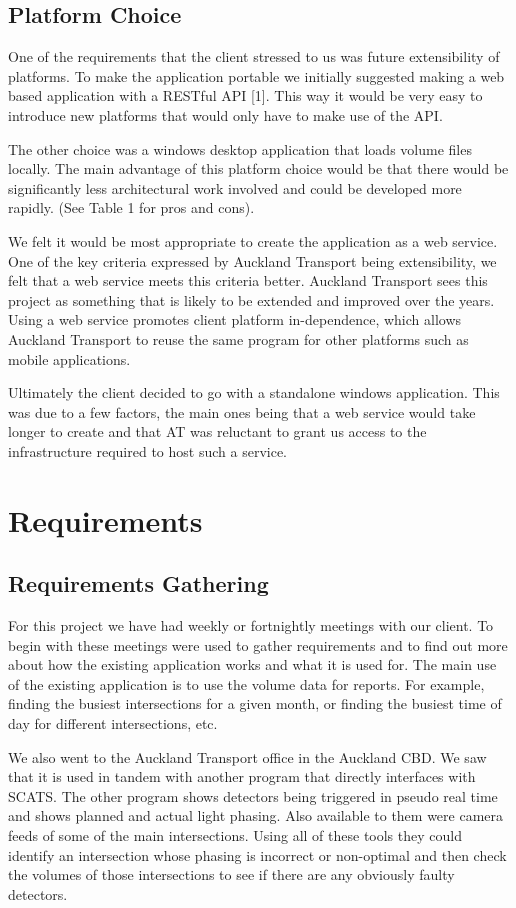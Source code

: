 \documentclass{article}
\begin{document}
\subsection{Platform Choice}
One of the requirements that the client stressed to us was
future extensibility of platforms. To make the application
portable we initially suggested making a web based
application with a RESTful API [1]. This way it would be
very easy to introduce new platforms that would only have to
make use of the API.

The other choice was a windows desktop application that
loads volume files locally. The main advantage of this
platform choice would be that there would be significantly less
architectural work involved and could be developed more
rapidly. (See Table 1 for pros and cons).

We felt it would be most appropriate to create the
application as a web service. One of the key criteria expressed
by Auckland Transport being extensibility, we felt that a web
service meets this criteria better. Auckland Transport sees this
project as something that is likely to be extended and
improved over the years. Using a web service promotes client
platform in-dependence, which allows Auckland Transport to
reuse the same program for other platforms such as mobile
applications.

Ultimately the client decided to go with a standalone
windows application. This was due to a few factors, the main
ones being that a web service would take longer to create and
that AT was reluctant to grant us access to the infrastructure
required to host such a service.

\section{Requirements}
\subsection{Requirements Gathering}
For this project we have had weekly or fortnightly
meetings with our client. To begin with these meetings were
used to gather requirements and to find out more about how
the existing application works and what it is used for.
The main use of the existing application is to use the
volume data for reports. For example, finding the busiest
intersections for a given month, or finding the busiest time of
day for different intersections, etc.

We also went to the Auckland Transport office in the
Auckland CBD. We saw that it is used in tandem with another
program that directly interfaces with SCATS. The other
program shows detectors being triggered in pseudo real time
and shows planned and actual light phasing. Also available to
them were camera feeds of some of the main intersections.
Using all of these tools they could identify an intersection
whose phasing is incorrect or non-optimal and then check the
volumes of those intersections to see if there are any obviously
faulty detectors.
\end{document}
